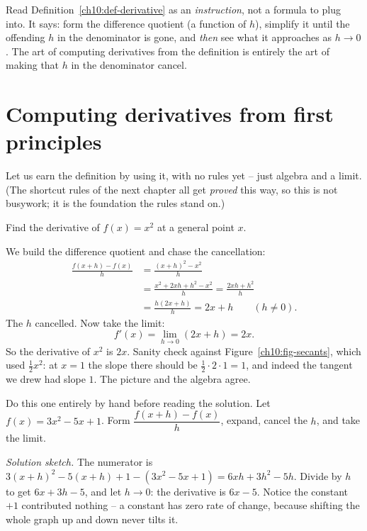 \begin{focusbox}
Read Definition~\ref{ch10:def-derivative} as an \emph{instruction}, not a formula
to plug into. It says: form the difference quotient (a function of $h$), simplify
it until the offending $h$ in the denominator is gone, and \emph{then} see what it
approaches as $h \to 0$. The art of computing derivatives from the definition is
entirely the art of making that $h$ in the denominator cancel.
\end{focusbox}

\section{Computing derivatives from first principles}
\label{ch10:first-principles}

Let us earn the definition by using it, with no rules yet -- just algebra and a
limit. (The shortcut rules of the next chapter all get \emph{proved} this way, so
this is not busywork; it is the foundation the rules stand on.)

\begin{example}[A parabola]
\label{ch10:ex-square}
Find the derivative of $f(x) = x^2$ at a general point $x$.
\end{example}

\noindent We build the difference quotient and chase the cancellation:
\begin{align*}
  \frac{f(x + h) - f(x)}{h}
  &= \frac{(x + h)^2 - x^2}{h} \\[2pt]
  &= \frac{x^2 + 2xh + h^2 - x^2}{h}
   = \frac{2xh + h^2}{h} \\[2pt]
  &= \frac{h(2x + h)}{h}
   = 2x + h \qquad (h \neq 0).
\end{align*}
The $h$ cancelled. Now take the limit:
\[
  f'(x) = \lim_{h \to 0} (2x + h) = 2x.
\]
So the derivative of $x^2$ is $2x$. Sanity check against
Figure~\ref{ch10:fig-secants}, which used $\tfrac12 x^2$: at $x = 1$ the slope
there should be $\tfrac12 \cdot 2 \cdot 1 = 1$, and indeed the tangent we drew had
slope $1$. The picture and the algebra agree.

\begin{labbox}
Do this one entirely by hand before reading the solution. Let $f(x) = 3x^2 - 5x
+ 1$. Form $\dfrac{f(x+h) - f(x)}{h}$, expand, cancel the $h$, and take the limit.

\smallskip
\noindent\emph{Solution sketch.} The numerator is
$3(x+h)^2 - 5(x+h) + 1 - (3x^2 - 5x + 1) = 6xh + 3h^2 - 5h$. Divide by $h$ to get
$6x + 3h - 5$, and let $h \to 0$: the derivative is $6x - 5$. Notice the constant
$+1$ contributed nothing -- a constant has zero rate of change, because shifting
the whole graph up and down never tilts it.
\end{labbox}

